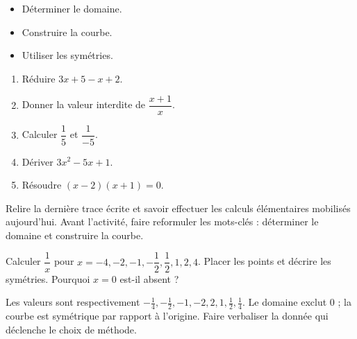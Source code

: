 \begin{objectives}\begin{itemize}\item Déterminer le domaine.\item Construire la courbe.\item Utiliser les symétries.\end{itemize}\end{objectives}
\begin{fluency}\begin{enumerate}\item Réduire $3x+5-x+2$. \item Donner la valeur interdite de $\dfrac{x+1}{x}$. \item Calculer $\dfrac1{5}$ et $\dfrac1{-5}$. \item Dériver $3x^2-5x+1$. \item Résoudre $(x-2)(x+1)=0$. \end{enumerate}\end{fluency}
\begin{prerequisites}Relire la dernière trace écrite et savoir effectuer les calculs élémentaires mobilisés aujourd'hui. Avant l'activité, faire reformuler les mots-clés : déterminer le domaine et construire la courbe.\end{prerequisites}

\begin{activity}
Calculer $\dfrac1x$ pour $x=-4,-2,-1,-\dfrac12,\dfrac12,1,2,4$. Placer les points et décrire les symétries. Pourquoi $x=0$ est-il absent ?
\begin{center}\end{center}
\end{activity}
\begin{solution}Les valeurs sont respectivement $-\frac14,-\frac12,-1,-2,2,1,\frac12,\frac14$. Le domaine exclut $0$ ; la courbe est symétrique par rapport à l'origine. Faire verbaliser la donnée qui déclenche le choix de méthode.\end{solution}

